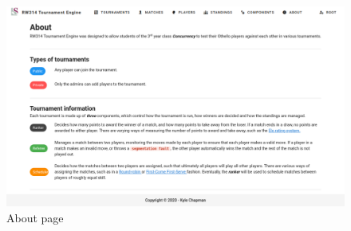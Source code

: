 \documentclass[a4paper, 12pt]{report}
\begin{document}
\begin{figure}[H]
	\centering
	\includegraphics[scale=0.37]{about-admin.png}
	\caption{About page}
	\label{fig:about-admin}
\end{figure}

\printbibliography
\end{document}
